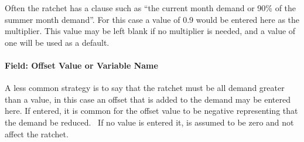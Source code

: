 Often the ratchet has a clause such as ``the current month demand or 90\% of the summer month demand''. For this case a value of 0.9 would be entered here as the multiplier. This value may be left blank if no multiplier is needed, and a value of one will be used as a default.

\paragraph{Field: Offset Value or Variable Name}\label{field-offset-value-or-variable-name}

A less common strategy is to say that the ratchet must be all demand greater than a value, in this case an offset that is added to the demand may be entered here. If entered, it is common for the offset value to be negative representing that the demand be reduced.~ If no value is entered it, is assumed to be zero and not affect the ratchet.